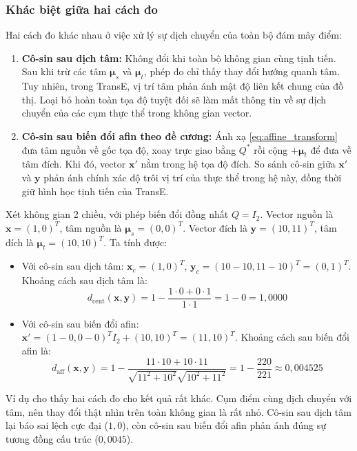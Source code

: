 \subsubsection{Khác biệt giữa hai cách đo}
Hai cách đo khác nhau ở việc xử lý sự dịch chuyển của toàn bộ đám mây điểm:
\begin{enumerate}
    \item \textbf{Cô-sin sau dịch tâm:} Không đổi khi toàn bộ không gian cùng tịnh tiến. Sau khi trừ các tâm $\boldsymbol{\mu}_s$ và $\boldsymbol{\mu}_t$, phép đo chỉ thấy thay đổi hướng quanh tâm. Tuy nhiên, trong TransE, vị trí tâm phản ánh mật độ liên kết chung của đồ thị. Loại bỏ hoàn toàn tọa độ tuyệt đối sẽ làm mất thông tin về sự dịch chuyển của các cụm thực thể trong không gian vector.
    \item \textbf{Cô-sin sau biến đổi afin theo đề cương:} Ánh xạ \eqref{eq:affine_transform} đưa tâm nguồn về gốc tọa độ, xoay trực giao bằng $Q^*$ rồi cộng $+\boldsymbol{\mu}_t$ để đưa về tâm đích. Khi đó, vector $\mathbf{x}'$ nằm trong hệ tọa độ đích. So sánh cô-sin giữa $\mathbf{x}'$ và $\mathbf{y}$ phản ánh chính xác độ trôi vị trí của thực thể trong hệ này, đồng thời giữ hình học tịnh tiến của TransE.
\end{enumerate}

\begin{example}
Xét không gian 2 chiều, với phép biến đổi đồng nhất $Q = I_2$.
Vector nguồn là $\mathbf{x} = (1, 0)^T$, tâm nguồn là $\boldsymbol{\mu}_s = (0, 0)^T$.
Vector đích là $\mathbf{y} = (10, 11)^T$, tâm đích là $\boldsymbol{\mu}_t = (10, 10)^T$.
Ta tính được:
\begin{itemize}
    \item Với cô-sin sau dịch tâm: $\mathbf{x}_c = (1, 0)^T$, $\mathbf{y}_c = (10-10, 11-10)^T = (0, 1)^T$.
    Khoảng cách sau dịch tâm là:
    \begin{equation}
    d_{\text{cent}}(\mathbf{x}, \mathbf{y}) = 1 - \frac{1 \cdot 0 + 0 \cdot 1}{1 \cdot 1} = 1 - 0 = 1{,}0000
    \end{equation}
    \item Với cô-sin sau biến đổi afin: $\mathbf{x}' = (1-0, 0-0)^T I_2 + (10, 10)^T = (11, 10)^T$.
    Khoảng cách sau biến đổi afin là:
    \begin{equation}
    d_{\text{aff}}(\mathbf{x}, \mathbf{y}) = 1 - \frac{11 \cdot 10 + 10 \cdot 11}{\sqrt{11^2 + 10^2} \sqrt{10^2 + 11^2}} = 1 - \frac{220}{221} \approx 0{,}004525
    \end{equation}
\end{itemize}
Ví dụ cho thấy hai cách đo cho kết quả rất khác. Cụm điểm cùng dịch chuyển với tâm, nên thay đổi thật nhìn trên toàn không gian là rất nhỏ. Cô-sin sau dịch tâm lại báo sai lệch cực đại ($1{,}0$), còn cô-sin sau biến đổi afin phản ánh đúng sự tương đồng cấu trúc ($0{,}0045$).
\end{example}

